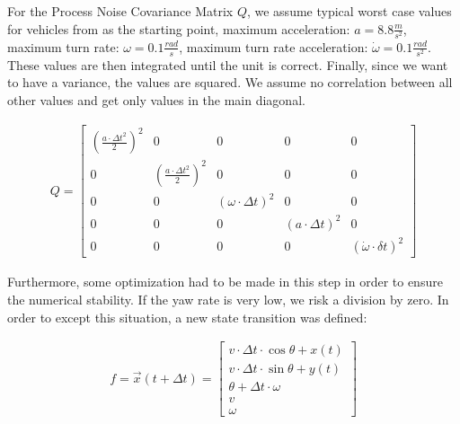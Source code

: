 \documentclass[11pt,oneside,openright]{mpreport}
\begin{document}
For the Process Noise Covariance Matrix $Q$, we assume typical worst case values for vehicles from \cite{Kelly1994} as the starting point,
maximum acceleration: $a = 8.8 \frac{m}{s^2}$, maximum turn rate: $\omega = 0.1 \frac{rad}{s}$,   maximum turn rate acceleration: $\dot\omega = 0.1 \frac{rad}{s^2}$.
These values are then integrated until the unit is correct. Finally, since we want to have a variance, the values are squared. 
We assume no correlation between all other values and get only values in the main diagonal.

\begin{align*}
Q=
\begin{bmatrix}
(\frac{a \cdot \Delta t^2}{2})^2 & 0 & 0 & 0 & 0\\
0 & (\frac{a \cdot \Delta t^2}{2})^2 & 0 & 0 & 0\\
0 & 0 & (\omega \cdot \Delta t)^2 & 0 & 0\\
0 & 0 & 0 & (a \cdot \Delta t)^2 & 0\\
0 & 0 & 0 & 0 & (\dot\omega \cdot \delta t)^2
\end{bmatrix} 
\end{align*}

% 

Furthermore, some optimization had to be made in this step in order to ensure the numerical stability. 
If the yaw rate is very low, we risk a division by zero. In order to except this situation, a new state transition was defined:

\begin{align*}
f = \vec{x}(t + \Delta t)=
\begin{bmatrix}
v \cdot \Delta t \cdot \cos{\theta}+ x(t) \\
v \cdot \Delta t \cdot \sin{\theta}+ y(t) \\
\theta + \Delta t \cdot \omega\\
v\\
\omega
\end{bmatrix} 
\end{align*}
\end{document}
